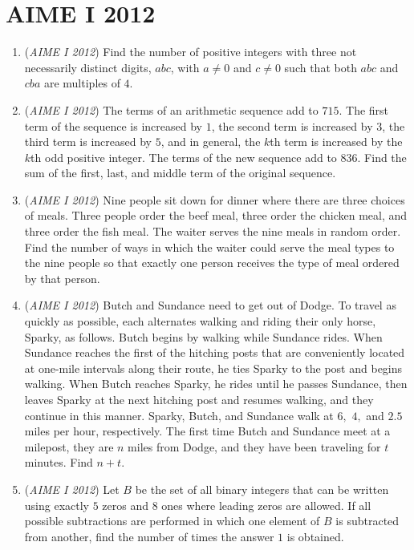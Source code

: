 \section{AIME I 2012}
        \begin{enumerate}
        	\item (\textit{AIME I 2012}) Find the number of positive integers with three not necessarily distinct digits, $abc$, with $a \neq 0$ and $c \neq 0$ such that both $abc$ and $cba$ are multiples of $4$.


 

	\item (\textit{AIME I 2012}) The terms of an arithmetic sequence add to $715$. The first term of the sequence is increased by $1$, the second term is increased by $3$, the third term is increased by $5$, and in general, the $k$th term is increased by the $k$th odd positive integer. The terms of the new sequence add to $836$. Find the sum of the first, last, and middle term of the original sequence.


 

	\item (\textit{AIME I 2012}) Nine people sit down for dinner where there are three choices of meals. Three people order the beef meal, three order the chicken meal, and three order the fish meal. The waiter serves the nine meals in random order. Find the number of ways in which the waiter could serve the meal types to the nine people so that exactly one person receives the type of meal ordered by that person.


 

	\item (\textit{AIME I 2012}) Butch and Sundance need to get out of Dodge. To travel as quickly as possible, each alternates walking and riding their only horse, Sparky, as follows. Butch begins by walking while Sundance rides. When Sundance reaches the first of the hitching posts that are conveniently located at one-mile intervals along their route, he ties Sparky to the post and begins walking. When Butch reaches Sparky, he rides until he passes Sundance, then leaves Sparky at the next hitching post and resumes walking, and they continue in this manner. Sparky, Butch, and Sundance walk at $6,$ $4,$ and $2.5$ miles per hour, respectively. The first time Butch and Sundance meet at a milepost, they are $n$ miles from Dodge, and they have been traveling for $t$ minutes. Find $n + t$.


 

	\item (\textit{AIME I 2012}) Let $B$ be the set of all binary integers that can be written using exactly $5$ zeros and $8$ ones where leading zeros are allowed. If all possible subtractions are performed in which one element of $B$ is subtracted from another, find the number of times the answer $1$ is obtained.



\end{enumerate}
